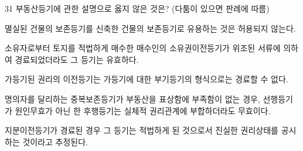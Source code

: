 \begin{question}{31}
부동산등기에 관한 설명으로 옳지 않은 것은? (다툼이 있으면 판례에 따름)
\begin{choices}
  \item 멸실된 건물의 보존등기를 신축한 건물의 보존등기로 유용하는 것은 허용되지 않는다.
  \item 소유자로부터 토지를 적법하게 매수한 매수인의 소유권이전등기가 위조된 서류에 의하여 경료되었더라도 그 등기는 유효하다.
  \item 가등기된 권리의 이전등기는 가등기에 대한 부기등기의 형식으로는 경료할 수 없다.
  \item 명의자를 달리하는 중복보존등기가 부동산을 표상함에 부족함이 없는 경우, 선행등기가 원인무효가 아닌 한 후행등기는 실체적 권리관계에 부합하더라도 무효이다.
  \item 지분이전등기가 경료된 경우 그 등기는 적법하게 된 것으로서 진실한 권리상태를 공시하는 것이라고 추정된다.
\end{choices}
\end{question}
